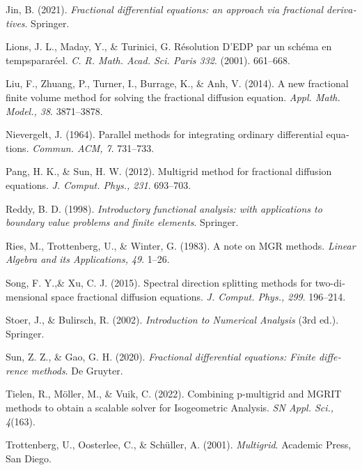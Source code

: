 \begin{latin}
\begin{thebibliography}{99}
Jin, B.
(2021).
\textit{Fractional differential equations: an approach via fractional derivatives}.
Springer.

Lions, J. L., Maday, Y., \& Turinici, G.
Résolution D’EDP par un schéma en tempspararéel.
\textit{C. R. Math. Acad. Sci. Paris 332}.
(2001).
661–668.

Liu, F., Zhuang, P., Turner, I., Burrage, K., \& Anh, V.
(2014).
A new fractional finite volume method for solving the fractional diffusion equation.
\textit{Appl. Math. Model., 38}.
3871–3878.

Nievergelt, J.
(1964).
Parallel methods for integrating ordinary differential equations.
\textit{Commun. ACM, 7}.
731–733.

Pang, H. K., \& Sun, H. W.
(2012).
Multigrid method for fractional diffusion equations.
\textit{J. Comput. Phys., 231}.
693–703.

Reddy, B. D.
(1998).
\textit{Introductory functional analysis: with applications to boundary value problems and finite elements}.
Springer.

Ries, M., Trottenberg, U., \& Winter, G.
(1983).
A note on MGR methods.
\textit{Linear Algebra and its Applications, 49}.
1–26.

Song, F. Y.,\& Xu, C. J.
(2015).
Spectral direction splitting methods for two-dimensional space fractional diffusion equations.
\textit{J. Comput. Phys., 299}.
196–214.

Stoer, J., \& Bulirsch, R.
(2002).
\textit{Introduction to Numerical Analysis} (3rd ed.).
Springer.

Sun, Z. Z., \& Gao, G. H.
(2020).
\textit{Fractional differential equations: Finite difference methods}.
De Gruyter.

Tielen, R., Möller, M., \& Vuik, C.
(2022).
Combining p-multigrid and MGRIT methods to obtain a scalable solver for Isogeometric Analysis.
\textit{SN Appl. Sci., 4}(163).

Trottenberg, U., Oosterlee, C., \& Schüller, A.
(2001).
\textit{Multigrid}. 
Academic Press, San Diego.


\end{thebibliography}
\end{latin}
